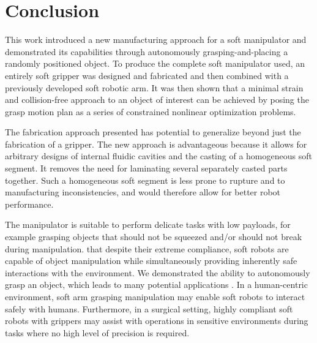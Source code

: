 \section{Conclusion}
\label{sec:conclusion}
This work introduced a new manufacturing approach for a soft manipulator and demonstrated its capabilities through autonomously grasping-and-placing a randomly positioned object.
To produce the complete soft manipulator used, an entirely soft gripper was designed and fabricated and then combined with a previously developed soft robotic arm.
It was then shown that a minimal strain and collision-free approach to an object of interest can be achieved by posing the grasp motion plan as a series of constrained nonlinear optimization problems.

The fabrication approach presented has potential to generalize beyond just the fabrication of a gripper.
The new approach is advantageous because it allows for arbitrary designs of internal fluidic cavities and the casting of a homogeneous soft segment. It removes the need for laminating several separately casted parts together.
Such a homogeneous soft segment is less prone to rupture and to manufacturing inconsistencies, and would therefore allow for better robot performance.

The manipulator is suitable to perform delicate tasks with low payloads, for example grasping objects that should not be squeezed and/or should not break during manipulation.
 that despite their extreme compliance, soft robots are capable of  object manipulation while simultaneously providing inherently safe interactions with the environment.
We  demonstrated the  ability to autonomously grasp an object, which leads to many potential applications .
In a human-centric environment, soft arm grasping manipulation may enable soft robots to interact safely with humans.
Furthermore, in a surgical setting, highly compliant soft robots with grippers may assist with operations in sensitive environments during tasks where no high level of precision is required.

